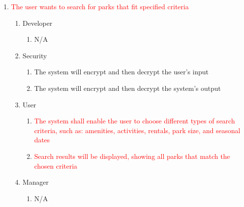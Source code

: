 \documentclass[titlepage]{article}
\begin{document}
\begin{enumerate}[{BE}1.]
	\item \textcolor{red}{The user wants to search for parks that fit specified criteria}
    \label{BE_combined}
    \begin{enumerate}[{VP\theenumi}.1]
        \item Developer
            \begin{enumerate}
                \item N/A
            \end{enumerate}
        \item Security
            \begin{enumerate}
                \item The system will encrypt and then decrypt the user's input
                \item The system will encrypt and then decrypt the system's output
            \end{enumerate}
        \item User
            \begin{enumerate}
                \item \textcolor{red}{The system shall enable the user to choose different types of
                search criteria, such as: amenities, activities, rentals, park size, and seasonal
                dates}
                \item \textcolor{red}{Search results will be displayed, showing all parks that match
                the chosen criteria}
            \end{enumerate}
        \item Manager
            \begin{enumerate}
                \item N/A
            \end{enumerate}
    \end{enumerate}


\end{enumerate}
\end{document}
